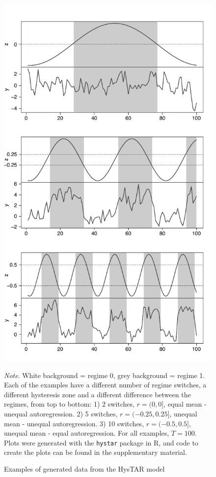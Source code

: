 \documentclass{article}
\begin{document}
\begin{figure} 
\caption{Examples of generated data from the HysTAR model}
\begin{center}
\includegraphics[scale=.75]{simulation_examples}
\end{center}
\bigskip
\small\textit{Note}. White background = regime 0, grey background = regime 1. Each of the examples have a different number of regime switches, a different hysteresis zone and a different difference between the regimes, from top to bottom: 1) 2 switches, $r = (0, 0]$, equal mean - unequal autoregression. 2) 5 switches, $r = (-0.25, 0.25]$, unequal mean - unequal autoregression. 3) 10 switches, $r = (-0.5, 0.5]$, unequal mean - equal autoregression. For all examples, $T = 100$. Plots were generated with the \texttt{hystar} package in \textsf{R}, and code to create the plots can be found in the supplementary material.
\label{fig:ts_examples}
\end{figure}
\end{document}
